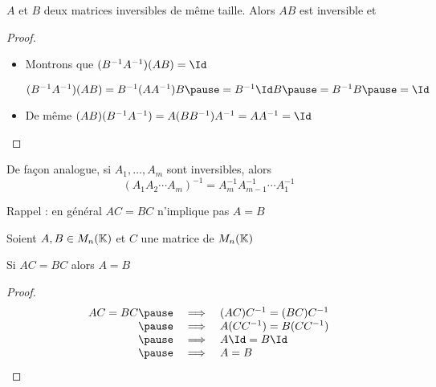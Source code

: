 \begin{frame}

\begin{proposition}%
 $A$ et $B$ deux matrices inversibles de même taille. Alors
 $AB$ est inversible 
 \pause
 et  \vspace*{-2ex}
\end{proposition}

\medskip
\pause
{}
\medskip

\pause
\begin{proof}
\begin{itemize}
\item Montrons que $(B^{-1}A^{-1}) (AB) = \Id$

\pause
\centerline{$
   (B^{-1}A^{-1}) (AB) = B^{-1}(AA^{-1})B \pause= B^{-1}\Id B\pause=B^{-1}B\pause=\Id
$}
\item\pause De même $(AB) (B^{-1} A^{-1})=A(BB^{-1})A^{-1} = A A^{-1} =  \Id$ \qedhere
 \end{itemize}
\end{proof}
 
\pause
De façon analogue, si $A_1, \dots , A_m$ sont inversibles, alors
\[
(A_1 A_2 \cdots A_m)^{-1} = A_m^{-1} A_{m-1}^{-1} \cdots A^{-1}_1
\]
\end{frame}



\begin{frame}

Rappel : en général  $AC=BC$ n'implique pas $A=B$
\medskip

\pause
\begin{proposition}%
Soient $A, B\in M_{n}(\mathbb{K})$ et $C$ une matrice  de $M_{n}(\mathbb{K})$

\smallskip
\pause
\centerline{Si $AC=BC$ alors $A=B$}
\end{proposition}

\pause
\begin{proof} 
$$\begin{array}{rcl}
AC=BC 
\pause&\implies& (AC)C^{-1}=(BC)C^{-1}\\
\pause&\implies& A(CC^{-1})=B(CC^{-1})\\
\pause&\implies& A\Id=B\Id\\
\pause&\implies& A=B
\end{array}$$
\end{proof} 

\end{frame}

